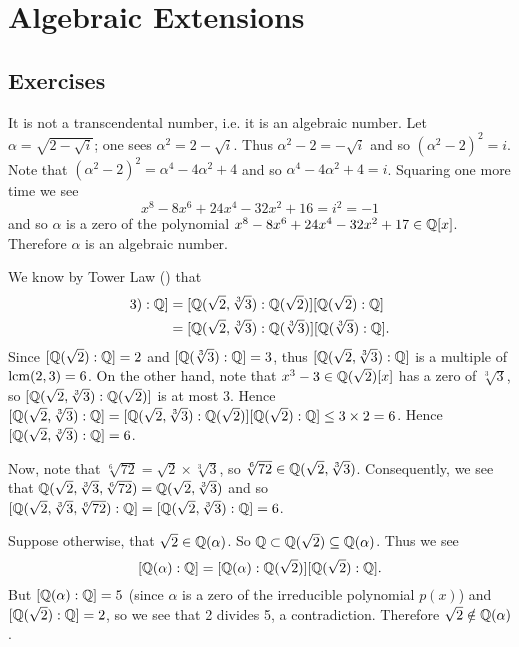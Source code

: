 \section{Algebraic Extensions}
\subsection*{Exercises}
\begin{questions}
    \item It is not a transcendental number, i.e. it is an algebraic number. Let $\alpha = \sqrt{2-\sqrt{i}}$; one sees $\alpha^2 = 2 - \sqrt{i}$. Thus $\alpha^2 - 2 = -\sqrt{i}$ and so $(\alpha^2-2)^2 = i$. Note that $(\alpha^2 - 2)^2 = \alpha^4 - 4\alpha^2 + 4$ and so $\alpha^4 - 4\alpha^2 + 4 = i$. Squaring one more time we see
    \[
        x^8 - 8x^6 + 24x^4 - 32x^2 + 16 = i^2 = -1
    \]
    and so $\alpha$ is a zero of the polynomial $x^8 - 8x^6 + 24x^4 - 32x^2 + 17 \in \mathbb{Q}[x]$. Therefore $\alpha$ is an algebraic number.

    \item We know by Tower Law () that
    \begin{align*}
        [\Q(\sqrt2, \sqrt[3]3): \Q] &= [\Q(\sqrt2, \sqrt[3]3): \Q(\sqrt2)][\Q(\sqrt2):\Q]\\
        &= [\Q(\sqrt2, \sqrt[3]3): \Q(\sqrt[3]3)][\Q(\sqrt[3]3):\Q].
    \end{align*}
    Since $[\mathbb{Q}(\sqrt2):\mathbb{Q}] = 2$ and $[\mathbb{Q}(\sqrt[3]3):\mathbb{Q}] = 3$, thus $[\mathbb{Q}(\sqrt2, \sqrt[3]3): \mathbb{Q}]$ is a multiple of $\mathrm{lcm}(2, 3) = 6$. On the other hand, note that $x^3 - 3 \in \mathbb{Q}(\sqrt2)[x]$ has a zero of $\sqrt[3]3$, so $[\mathbb{Q}(\sqrt2, \sqrt[3]3): \mathbb{Q}(\sqrt2)]$ is at most 3. Hence $[\mathbb{Q}(\sqrt2, \sqrt[3]3): \mathbb{Q}] = [\mathbb{Q}(\sqrt2, \sqrt[3]3): \mathbb{Q}(\sqrt2)][\mathbb{Q}(\sqrt2):\mathbb{Q}] \leq 3 \times 2 = 6$. Hence $[\mathbb{Q}(\sqrt2, \sqrt[3]3): \mathbb{Q}] = 6$.

    Now, note that $\sqrt[6]{72} = \sqrt2 \times \sqrt[3]3$, so $\sqrt[6]{72} \in \mathbb{Q}(\sqrt2, \sqrt[3]3)$. Consequently, we see that $\mathbb{Q}(\sqrt2, \sqrt[3]3, \sqrt[6]{72}) = \mathbb{Q}(\sqrt2, \sqrt[3]3)$ and so $[\mathbb{Q}(\sqrt2, \sqrt[3]3, \sqrt[6]{72}):\mathbb{Q}] = [\mathbb{Q}(\sqrt2, \sqrt[3]3): \mathbb{Q}] = 6$.

    \item Suppose otherwise, that $\sqrt2 \in \mathbb{Q}(\alpha)$. So $\mathbb{Q} \subset \mathbb{Q}(\sqrt2) \subseteq \mathbb{Q}(\alpha)$. Thus we see
    \[
        [\mathbb{Q}(\alpha): \mathbb{Q}] = [\mathbb{Q}(\alpha):\mathbb{Q}(\sqrt2)][\mathbb{Q}(\sqrt2):\mathbb{Q}].
    \]
    But $[\mathbb{Q}(\alpha): \mathbb{Q}] = 5$ (since $\alpha$ is a zero of the irreducible polynomial $p(x)$) and $[\mathbb{Q}(\sqrt2):\mathbb{Q}] = 2$, so we see that 2 divides 5, a contradiction. Therefore $\sqrt2 \notin \mathbb{Q}(\alpha)$.


\end{questions}
